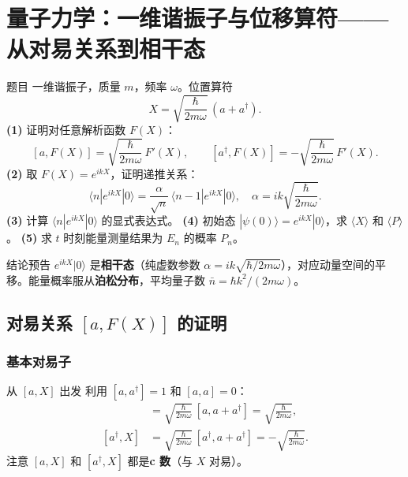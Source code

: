 \section{量子力学：一维谐振子与位移算符——从对易关系到相干态}

\begin{modelbox}{题目}
一维谐振子，质量 $m$，频率 $\omega$。位置算符
\[
  X = \sqrt{\frac{\hbar}{2m\omega}}\,(a + a^\dagger).
\]
\textbf{(1)} 证明对任意解析函数 $F(X)$：
\[
  [a, F(X)] = \sqrt{\frac{\hbar}{2m\omega}}\,F'(X), \qquad
  [a^\dagger, F(X)] = -\sqrt{\frac{\hbar}{2m\omega}}\,F'(X).
\]
\textbf{(2)} 取 $F(X)=e^{ikX}$，证明递推关系：
\[
  \langle n|e^{ikX}|0\rangle = \frac{\alpha}{\sqrt{n}}\,\langle n-1|e^{ikX}|0\rangle,
  \quad \alpha = ik\sqrt{\frac{\hbar}{2m\omega}}.
\]
\textbf{(3)} 计算 $\langle n|e^{ikX}|0\rangle$ 的显式表达式。
\textbf{(4)} 初始态 $|\psi(0)\rangle = e^{ikX}|0\rangle$，求 $\langle X\rangle$ 和 $\langle P\rangle$。
\textbf{(5)} 求 $t$ 时刻能量测量结果为 $E_n$ 的概率 $P_n$。
\end{modelbox}

\vspace{0.3em}
\begin{insightbox}{结论预告}
$e^{ikX}|0\rangle$ 是\textbf{相干态}（纯虚数参数 $\alpha=ik\sqrt{\hbar/2m\omega}$），对应动量空间的平移。能量概率服从\textbf{泊松分布}，平均量子数 $\bar{n}=\hbar k^2/(2m\omega)$。
\end{insightbox}


\subsection{对易关系 $[a, F(X)]$ 的证明}

\subsubsection{基本对易子}

\begin{derivationbox}{从 $[a,X]$ 出发}
利用 $[a, a^\dagger]=1$ 和 $[a,a]=0$：
\begin{align*}
  [a, X] &= \sqrt{\frac{\hbar}{2m\omega}}\,[a, a+a^\dagger]
         = \sqrt{\frac{\hbar}{2m\omega}}, \\
  [a^\dagger, X] &= \sqrt{\frac{\hbar}{2m\omega}}\,[a^\dagger, a+a^\dagger]
                 = -\sqrt{\frac{\hbar}{2m\omega}}.
\end{align*}
注意 $[a,X]$ 和 $[a^\dagger,X]$ 都是\textbf{c 数}（与 $X$ 对易）。
\end{derivationbox}

